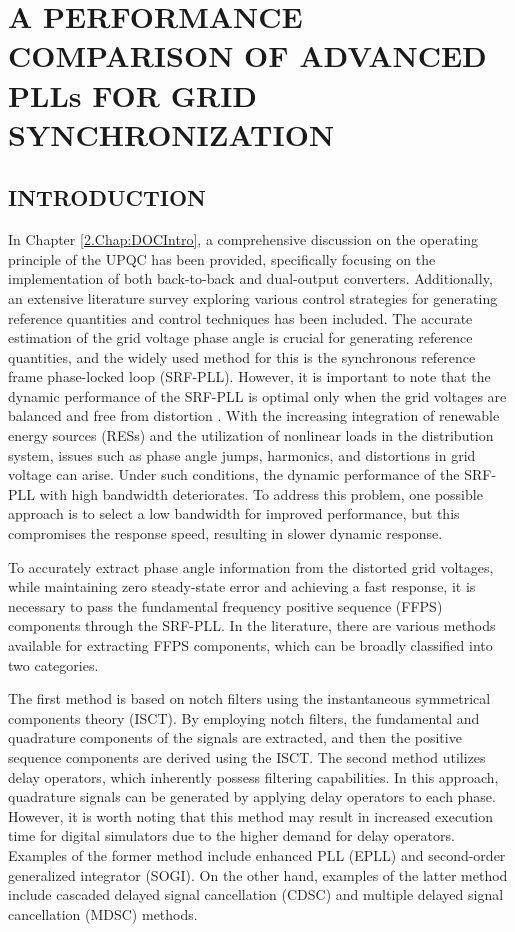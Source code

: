 \chapter{A PERFORMANCE COMPARISON OF ADVANCED PLLs FOR GRID SYNCHRONIZATION} 
\label{3.Chap:PLL}
\section{INTRODUCTION} 
In Chapter \ref{2.Chap:DOCIntro}, a comprehensive discussion on the operating principle of the UPQC has been provided, specifically focusing on the implementation of both back-to-back and dual-output converters. Additionally, an extensive literature survey exploring various control strategies for generating reference quantities and control techniques has been included. The accurate estimation of the grid voltage phase angle is crucial for generating reference quantities, and the widely used method for this is the synchronous reference frame phase-locked loop (SRF-PLL). However, it is important to note that the dynamic performance of the SRF-PLL is optimal only when the grid voltages are balanced and free from distortion \cite{844502}. With the increasing integration of renewable energy sources (RESs) and the utilization of nonlinear loads in the distribution system, issues such as phase angle jumps, harmonics, and distortions in grid voltage can arise. Under such conditions, the dynamic performance of the SRF-PLL with high bandwidth deteriorates. To address this problem, one possible approach is to select a low bandwidth for improved performance, but this compromises the response speed, resulting in slower dynamic response. 

To accurately extract phase angle information from the distorted grid voltages, while maintaining zero steady-state error and achieving a fast response, it is necessary to pass the fundamental frequency positive sequence (FFPS) components through the SRF-PLL. In the literature, there are various methods available for extracting FFPS components, which can be broadly classified into two categories.

The first method is based on notch filters using the instantaneous symmetrical components theory (ISCT). By employing notch filters, the fundamental and quadrature components of the signals are extracted, and then the positive sequence components are derived using the ISCT. The second method utilizes delay operators, which inherently possess filtering capabilities. In this approach, quadrature signals can be generated by applying delay operators to each phase. However, it is worth noting that this method may result in increased execution time for digital simulators due to the higher demand for delay operators. Examples of the former method include enhanced PLL (EPLL) and second-order generalized integrator (SOGI). On the other hand, examples of the latter method include cascaded delayed signal cancellation (CDSC) and multiple delayed signal cancellation (MDSC) methods.

